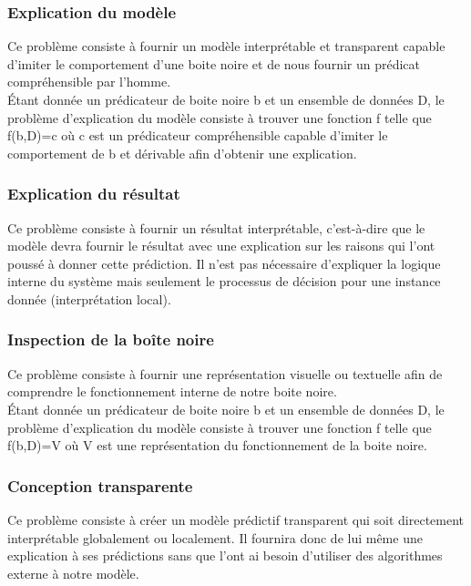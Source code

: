 \subsubsection{Explication du modèle}
Ce problème consiste à fournir un modèle interprétable et transparent capable d'imiter le comportement d'une boite noire et de nous fournir un prédicat compréhensible par l'homme.\\
Étant donnée un prédicateur de boite noire b et un ensemble de données D, le problème d'explication du modèle consiste à trouver une fonction f telle que f(b,D)=c où c est un prédicateur compréhensible capable d'imiter le comportement de b et dérivable afin d'obtenir une explication.

\subsubsection{Explication du résultat}
Ce problème consiste à fournir un résultat interprétable, c'est-à-dire que le modèle devra fournir le résultat avec une explication sur les raisons qui l'ont poussé à donner cette prédiction. Il n'est pas nécessaire d'expliquer la logique interne du système mais seulement le processus de décision pour une instance donnée (interprétation local).

\subsubsection{Inspection de la boîte noire}
Ce problème consiste à fournir une représentation visuelle ou textuelle afin de comprendre le fonctionnement interne de notre boite noire.\\
Étant donnée un prédicateur de boite noire b et un ensemble de données D, le problème d'explication du modèle consiste à trouver une fonction f telle que f(b,D)=V où V est une représentation du fonctionnement de la boite noire.

\subsubsection{Conception transparente}
Ce problème consiste à créer un modèle prédictif transparent qui soit directement interprétable globalement ou localement. Il fournira donc de lui même une explication à ses prédictions sans que l'ont ai besoin d'utiliser des algorithmes externe à notre modèle.

